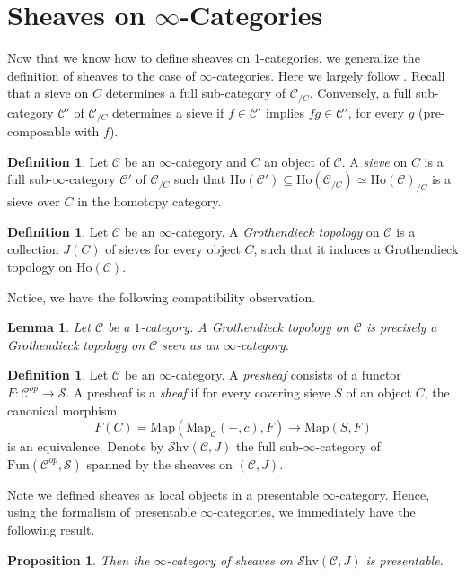 \documentclass[10pt]{amsart}
\newcommand{\C}{\mathscr{C}}
\newcommand{\s}{\mathscr{S}}
\newcommand{\Map}{\mathrm{Map}}
\newcommand{\Ho}{\mathrm{Ho}}
\newcommand{\Fun}{\mathrm{Fun}}
\newcommand{\Shv}{\mathscr{S}\mathrm{hv}}
\newtheorem{lemma}[equation]{Lemma}
\newtheorem{proposition}[equation]{Proposition}
\theoremstyle{definition}
\newtheorem{definition}[equation]{Definition}
\theoremstyle{remark}
\begin{document}
	\section{Sheaves on \texorpdfstring{$\infty$}{oo}-Categories}
	Now that we know how  to define sheaves on 1-categories, we generalize the definition of sheaves to the case of $\infty$-categories. Here we largely follow \cite{lurie2009htt}. Recall that a sieve on $C$ determines a full sub-category of $\C_{/C}$. Conversely, a full sub-category $\C'$ of $\C_{/C}$ determines a sieve if $f\in\C'$ implies $fg\in\C'$, for every $g$ (pre-composable with $f$). 
	\begin{definition}
		Let $\C$ be an $\infty$-category and $C$ an object of $\C$. A \textit{sieve} on $C$ is a full sub-$\infty$-category $\C'$ of $\C_{/C}$ such that $\Ho(\C')\subseteq\Ho(\C_{/C})\simeq\Ho(\C)_{/C}$ is a sieve over $C$ in the homotopy category. 
	\end{definition}
	\begin{definition}
		Let $\C$ be an $\infty$-category. A \emph{Grothendieck topology} on $\C$ is a collection $J(C)$ of sieves for every object $C$, such that it induces a Grothendieck topology on $\Ho(\C)$. 
	\end{definition}
	
	Notice, we have the following compatibility observation.
	\begin{lemma}
		Let $\C$ be a $1$-category. A Grothendieck topology on $\C$ is precisely a Grothendieck topology on $\C$ seen as an $\infty$-category.
	\end{lemma}
  

	\begin{definition}
		Let $\C$ be an $\infty$-category. A \emph{presheaf} consists of a functor $F : \C^{op} \to \s$. A presheaf is a \emph{sheaf} if for every covering sieve $S$ of an object $C$, the canonical morphism
		\[ F(C) = \Map(\Map_\C(-,c),F) \to \Map(S,F) \]
		is an equivalence. Denote by $\Shv(\C,J)$ the full sub-$\infty$-category of $\Fun(\C^{op},\s)$ spanned by the sheaves on $(\C,J)$.
	\end{definition}
	
	Note we defined sheaves as local objects in a presentable $\infty$-category. Hence, using the formalism of presentable $\infty$-categories, we immediately have the following result. 
	
	\begin{proposition}
		Then the $\infty$-category of sheaves on $\Shv(\C,J)$ is presentable.
	\end{proposition}
	
\end{document}
